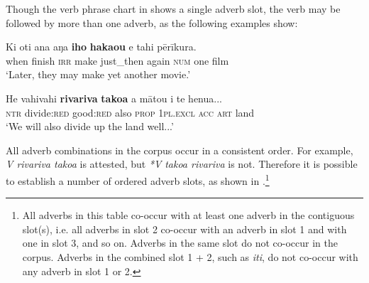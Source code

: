 Though the verb phrase chart in  shows a single adverb slot, the verb may be followed by more than one adverb, as the following examples show:

\ea\label{ex:4.125}
\gll Ki oti ana aŋa \textbf{iho} \textbf{haka{\ꞌ}ou} e tahi pērīkura.\\
when finish \textsc{irr} make just\_then again \textsc{num} one film\\

\glt 
‘Later, they may make yet another movie.’ \textstyleExampleref{[R647.253]} 
\z

\ea\label{ex:4.126}
\gll He vahivahi \textbf{rivariva} \textbf{tako{\ꞌ}a} a mātou i te henua...\\
\textsc{ntr} divide:\textsc{red} good:\textsc{red} also \textsc{prop} \textsc{1pl.excl} \textsc{acc} \textsc{art} land\\

\glt
‘We will also divide up the land well...’ \textstyleExampleref{[R648.224]} 
\z

All adverb combinations in the corpus occur in a consistent order. For example, \textit{V rivariva tako{\ꞌ}a} is attested, but \textit{*V} \textit{tako{\ꞌ}a rivariva} is not. Therefore it is possible to establish a number of ordered adverb slots, as shown in .\footnote{\label{fn:191}All adverbs in this table co-occur with at least one adverb in the contiguous slot(s), i.e. all adverbs in slot 2 co-occur with an adverb in slot 1 and with one in slot 3, and so on. Adverbs in the same slot do not co-occur in the corpus. Adverbs in the combined slot 1 + 2, such as \textit{{\ꞌ}iti}, do not co-occur with any adverb in slot 1 or 2.} 

